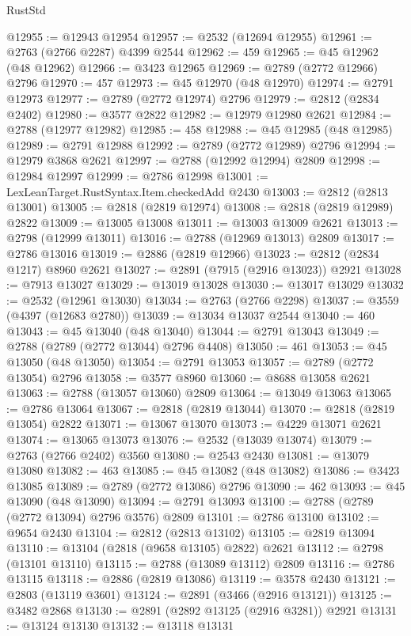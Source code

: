 \begin{lexlean}{RustStd}
\begin{coremodule}
@12955 := @12943 @12954
@12957 := @2532 (@12694 @12955)
@12961 := @2763 (@2766 @2287) @4399 @2544
@12962 := 459
@12965 := @45 @12962 (@48 @12962)
@12966 := @3423 @12965
@12969 := @2789 (@2772 @12966) @2796
@12970 := 457
@12973 := @45 @12970 (@48 @12970)
@12974 := @2791 @12973
@12977 := @2789 (@2772 @12974) @2796
@12979 := @2812 (@2834 @2402)
@12980 := @3577 @2822
@12982 := @12979 @12980 @2621
@12984 := @2788 (@12977 @12982)
@12985 := 458
@12988 := @45 @12985 (@48 @12985)
@12989 := @2791 @12988
@12992 := @2789 (@2772 @12989) @2796
@12994 := @12979 @3868 @2621
@12997 := @2788 (@12992 @12994) @2809
@12998 := @12984 @12997
@12999 := @2786 @12998
@13001 := LexLeanTarget.RustSyntax.Item.checkedAdd @2430
@13003 := @2812 (@2813 @13001)
@13005 := @2818 (@2819 @12974)
@13008 := @2818 (@2819 @12989) @2822
@13009 := @13005 @13008
@13011 := @13003 @13009 @2621
@13013 := @2798 (@12999 @13011)
@13016 := @2788 (@12969 @13013) @2809
@13017 := @2786 @13016
@13019 := @2886 (@2819 @12966)
@13023 := @2812 (@2834 @1217) @8960 @2621
@13027 := @2891 (@7915 (@2916 @13023)) @2921
@13028 := @7913 @13027
@13029 := @13019 @13028
@13030 := @13017 @13029
@13032 := @2532 (@12961 @13030)
@13034 := @2763 (@2766 @2298)
@13037 := @3559 (@4397 (@12683 @2780))
@13039 := @13034 @13037 @2544
@13040 := 460
@13043 := @45 @13040 (@48 @13040)
@13044 := @2791 @13043
@13049 := @2788 (@2789 (@2772 @13044) @2796 @4408)
@13050 := 461
@13053 := @45 @13050 (@48 @13050)
@13054 := @2791 @13053
@13057 := @2789 (@2772 @13054) @2796
@13058 := @3577 @8960
@13060 := @8688 @13058 @2621
@13063 := @2788 (@13057 @13060) @2809
@13064 := @13049 @13063
@13065 := @2786 @13064
@13067 := @2818 (@2819 @13044)
@13070 := @2818 (@2819 @13054) @2822
@13071 := @13067 @13070
@13073 := @4229 @13071 @2621
@13074 := @13065 @13073
@13076 := @2532 (@13039 @13074)
@13079 := @2763 (@2766 @2402) @3560
@13080 := @2543 @2430
@13081 := @13079 @13080
@13082 := 463
@13085 := @45 @13082 (@48 @13082)
@13086 := @3423 @13085
@13089 := @2789 (@2772 @13086) @2796
@13090 := 462
@13093 := @45 @13090 (@48 @13090)
@13094 := @2791 @13093
@13100 := @2788 (@2789 (@2772 @13094) @2796 @3576) @2809
@13101 := @2786 @13100
@13102 := @9654 @2430
@13104 := @2812 (@2813 @13102)
@13105 := @2819 @13094
@13110 := @13104 (@2818 (@9658 @13105) @2822) @2621
@13112 := @2798 (@13101 @13110)
@13115 := @2788 (@13089 @13112) @2809
@13116 := @2786 @13115
@13118 := @2886 (@2819 @13086)
@13119 := @3578 @2430
@13121 := @2803 (@13119 @3601)
@13124 := @2891 (@3466 (@2916 @13121))
@13125 := @3482 @2868
@13130 := @2891 (@2892 @13125 (@2916 @3281)) @2921
@13131 := @13124 @13130
@13132 := @13118 @13131

\end{coremodule}
\end{lexlean}

